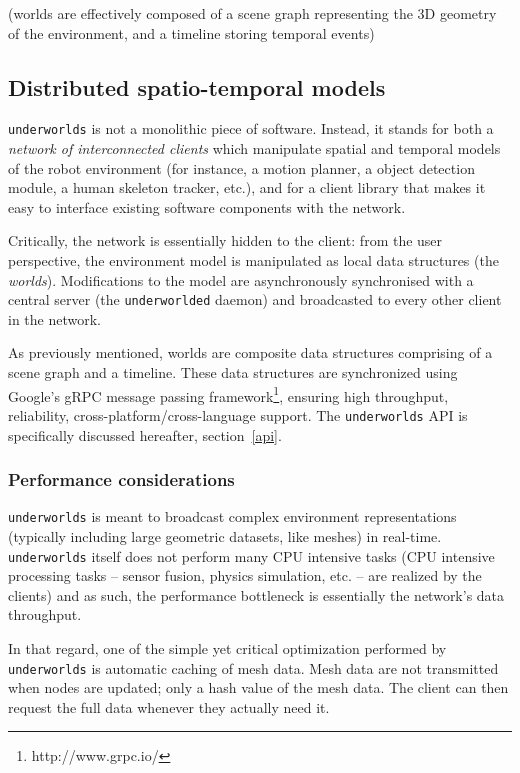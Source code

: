 \documentclass[letterpaper, 10 pt, conference]{ieeeconf}  %
\newcommand{\uwds}{{\tt underworlds}\xspace}
\begin{document}
(worlds are effectively composed of a scene graph representing the 3D geometry
of the environment, and a timeline storing temporal events)

\subsection{Distributed spatio-temporal models}
\label{arch}

\uwds is not a monolithic piece of software. Instead, it stands for both a
\emph{network of interconnected clients} which manipulate spatial and temporal
models of the robot environment (for instance, a motion planner, a object
detection module, a human skeleton tracker, etc.), and for a {client library}
that makes it easy to interface existing software components with the network.

Critically, the network is essentially hidden to the client: from the user
perspective, the environment model is manipulated as local data structures (the
\emph{worlds}). Modifications to the model are asynchronously synchronised with
a central server (the {\tt underworlded} daemon) and broadcasted to every other
client in the network.

As previously mentioned, worlds are composite data structures comprising of a
scene graph and a timeline. These data structures are synchronized using
Google's gRPC message passing framework\footnote{http://www.grpc.io/}, ensuring
high throughput, reliability, cross-platform/cross-language support. The \uwds
API is specifically discussed hereafter, section~\ref{api}.


\subsubsection*{Performance considerations}

\uwds is meant to broadcast complex environment representations (typically
including large geometric datasets, like meshes) in real-time. \uwds itself does
not perform many CPU intensive tasks (CPU intensive processing tasks -- sensor fusion, physics
simulation, etc. -- are realized by the clients) and as such, the performance
bottleneck is essentially the network's data throughput.

In that regard, one of the simple yet critical optimization performed by \uwds
is automatic caching of mesh data. Mesh data are not transmitted when nodes are
updated; only a hash value of the mesh data. The client can then request the
full data whenever they actually need it.
\end{document}
